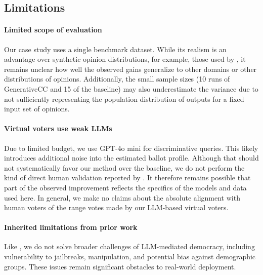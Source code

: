 \documentclass[letterpaper]{article} %
\begin{document}
\subsection{Limitations} \label{sec:limitations}

\paragraph{Limited scope of evaluation}
Our case study uses a single benchmark dataset.
While its realism is an advantage over synthetic opinion distributions, for example, those used by \citet{chandak-2023}, it remains unclear how well the observed gains generalize to other domains or other distributions of opinions.
Additionally, the small sample sizes (10 runs of GenerativeCC and 15 of the baseline) may also underestimate the variance due to not sufficiently representing the population distribution of outputs for a fixed input set of opinions.

\paragraph{Virtual voters use weak LLMs}
Due to limited budget, we use GPT-4o mini for discriminative queries.
This likely introduces additional noise into the estimated ballot profile.
Although that should not systematically favor our method over the baseline, we do not perform the kind of direct human validation reported by \citet{fish-v2}.
It therefore remains possible that part of the observed improvement reflects the specifics of the models and data used here.
In general, we make no claims about the absolute alignment with human voters of the range votes made by our LLM-based virtual voters.

\paragraph{Inherited limitations from prior work}
Like \citet{fish-v2}, we do not solve broader challenges of LLM-mediated democracy, including vulnerability to jailbreaks, manipulation, and potential bias against demographic groups.
These issues remain significant obstacles to real-world deployment.
\end{document}
